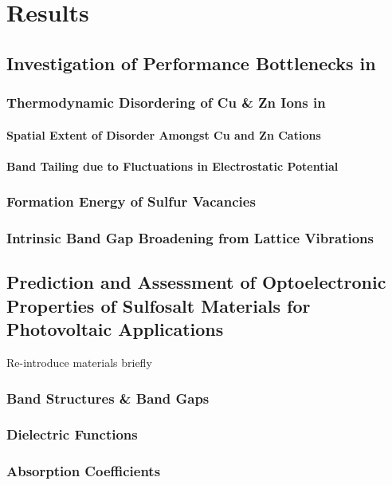 \chapter{Results}
\section{Investigation of Performance Bottlenecks in \CZTS}
\subsection{Thermodynamic Disordering of Cu \& Zn Ions in \CZTS}
\subsubsection{Spatial Extent of Disorder Amongst Cu and Zn Cations}
\subsubsection{Band Tailing due to Fluctuations in Electrostatic Potential}
\subsection{Formation Energy of Sulfur Vacancies}
\subsection{Intrinsic Band Gap Broadening from Lattice Vibrations}
 
\section{Prediction and Assessment of Optoelectronic Properties of Sulfosalt Materials for Photovoltaic Applications}
Re-introduce materials briefly
\subsection{Band Structures \& Band Gaps}
\subsection{Dielectric Functions}
\subsection{Absorption Coefficients}